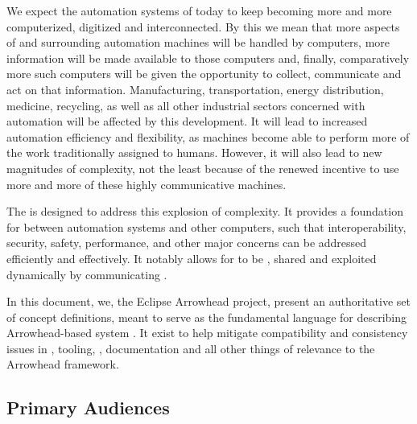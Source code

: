 %
%

We expect the automation systems of today to keep becoming more and more computerized, digitized and interconnected.
By this we mean that more aspects of and surrounding automation machines will be handled by computers, more information will be made available to those computers and, finally, comparatively more such computers will be given the opportunity to collect, communicate and act on that information.
Manufacturing, transportation, energy distribution, medicine, recycling, as well as all other industrial sectors concerned with automation will be affected by this development.
It will lead to increased automation efficiency and flexibility, as machines become able to perform more of the work traditionally assigned to humans.
However, it will also lead to new magnitudes of complexity, not the least because of the renewed incentive to use more and more of these highly communicative machines.

The  is designed to address this explosion of complexity.
It provides a foundation for  \cite{mackenzie2006reference} between automation systems and other computers, such that interoperability, security, safety, performance, and other major concerns can be addressed efficiently and effectively.
It notably allows for   to be , shared and exploited dynamically by communicating .

In this document, we, the Eclipse Arrowhead project, present an authoritative set of concept definitions, meant to serve as the fundamental language for describing Arrowhead-based system .
It exist to help mitigate compatibility and consistency issues in , tooling, , documentation and all other things of relevance to the Arrowhead framework.

\subsection{Primary Audiences}
\label{sec:introduction:audiences}

